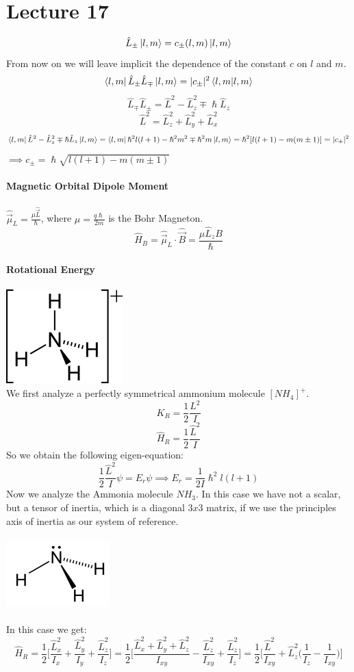 \documentclass{article}
\begin{document}
\section{Lecture 17}
$$\hat{L}_{\pm} \ket{l,m} = c_{\pm}(l,m) \ket{l,m}$$
From now on we will leave implicit the dependence of the constant $c$ on $l$ and $m$.
$$\bra{l,m} \hat{L}_{\pm} \hat{L}_{\mp} \ket{l,m} = |c_{\pm}|^2 \bra{l,m}\ket{l,m}$$
$$\hat{L}_{\mp}\hat{L}_{\pm} = \hat{L}^2 - \hat{L}_z^2 \mp \hslash \hat{L}_z$$
$$\hat{L}^2 = \hat{L}_z^2 + \hat{L}_y^2 + \hat{L}_x^2$$
$$\bra{l,m}\hat{L}^2-\hat{L}_z^2 \mp \hslash \hat{L}_z \ket{l,m} = \bra{l,m}\hslash^2 l(l+1)- \hslash^2m^2 \mp \hslash^2 m \ket{l,m} = \hslash^2 [l(l+1)-m(m \pm1)] = |c_{\pm}|^2$$
$\implies c_{\pm} = \hslash \sqrt{l(l+1)-m(m\pm1)}$ \\ \\
\textbf{Magnetic Orbital Dipole Moment} \\ \\
$\hat{\Vec{\mu}}_L = \frac{\mu \hat{\Vec{L}}}{\hslash}$, where $\mu = \frac{q\hslash}{2m}$ is the Bohr Magneton.
$$\hat{H}_B = \hat{\Vec{\mu}}_L \cdot \hat{\Vec{B}} = \frac{\mu\hat{L}_z B}{\hslash}$$
\\
\textbf{Rotational Energy} \\ \\
\includegraphics[scale = 0.5]{ammonium.png} \\ 
We first analyze a perfectly symmetrical ammonium molecule $[NH_4]^+$.
$$K_R = \frac{1}{2} \frac{L^2}{I}$$
$$\hat{H}_R = \frac{1}{2} \frac{\hat{L}^2}{I}$$
So we obtain the following eigen-equation:
$$\frac{1}{2} \frac{\hat{L}^2}{I} \psi = E_r \psi \implies E_r = \frac{1}{2I}\hslash^2 l(l+1)$$
Now we analyze the Ammonia molecule $NH_3$.
In this case we have not a scalar, but a tensor of inertia, which is a diagonal $3x3$ matrix, if we use the principles axis of inertia as our system of reference.\\ \\ 
\includegraphics[scale = 0.5]{ammonia.png} \\  \\
In this case we get:
$$ \hat{H}_R = \frac{1}{2} \Biggl[ \frac{\hat{L}_x^2}{I_x} + \frac{\hat{L}_y^2}{I_y}+ \frac{\hat{L}_z^2}{I_z} \Biggl] = \frac{1}{2} \Biggl[ \frac{\hat{L}_x^2 + \hat{L}_y^2 + \hat{L}_z^2}{I_{xy}}- \frac{\hat{L}_z^2}{I_{xy}} + \frac{\hat{L}_z^2}{I_z} \Biggl] = \frac{1}{2} \Biggl[ \frac{\hat{L}^2}{I_{xy}} + \hat{L}_z^2 \Biggl( \frac{1}{I_z}- \frac{1}{I_{xy}} \biggl) \Biggl]
$$
\end{document}
